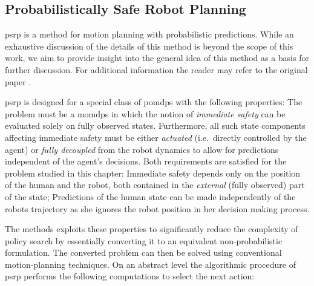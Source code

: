 \subsection{Probabilistically Safe Robot Planning}\label{sec:hri-baseline}

\acf{psrp} is a method for motion planning with probabilistic predictions.
While an exhaustive discussion of the details of this method is beyond the
scope of this work, we aim to provide insight into the general idea of this
method as a basis for further discussion. For additional information the reader
may refer to the original paper \cite{fisac2018probabilistically}.

\ac{psrp} is designed for a special class of \acp{pomdp} with the following
properties: The problem must be a \acp{momdp} in which the notion of
\emph{immediate safety} can be evaluated solely on fully observed states.
Furthermore, all such state components affecting immediate safety must be
either \emph{actuated} (i.e. directly controlled by the agent) or \emph{fully
decoupled} from the robot dynamics to allow for predictions independent of the
agent's decisions. Both requirements are satisfied for the problem studied in
this chapter: Immediate safety depends only on the position of the human and
the robot, both contained in the \emph{external} (fully observed) part of the
state; Predictions of the human state can be made independently of the robots
trajectory as she ignores the robot position in her decision making process.

The methods exploits these properties to significantly reduce the complexity of
policy search by essentially converting it to an equivalent non-probabilistic
formulation. The converted problem can then be solved using conventional
motion-planning techniques. On an abstract level the algorithmic procedure of
\ac{psrp} performs the following computations to select the next action:

